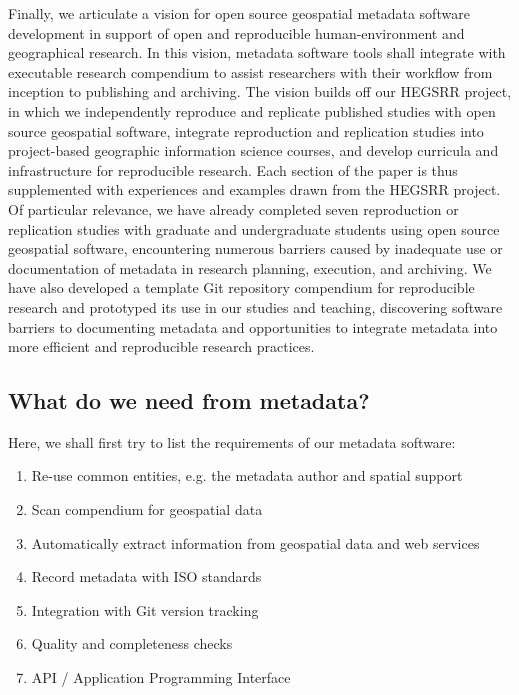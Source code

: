 \documentclass{isprs} %
\begin{document}
Finally, we articulate a vision for open source geospatial metadata software development in support of open and reproducible human-environment and geographical research.
In this vision, metadata software tools shall integrate with executable research compendium to assist researchers with their workflow from inception to publishing and archiving.
The vision builds off our HEGSRR project, in which we independently reproduce and replicate published studies with open source geospatial software, integrate reproduction and replication studies into project-based geographic information science courses, and develop curricula and infrastructure for reproducible research.
Each section of the paper is thus supplemented with experiences and examples drawn from the HEGSRR project.
Of particular relevance, we have already completed seven reproduction or replication studies with graduate and undergraduate students using open source geospatial software, encountering numerous barriers caused by inadequate use or documentation of metadata in research planning, execution, and archiving.
We have also developed a template Git repository compendium for reproducible research and prototyped its use in our studies and teaching, discovering software barriers to documenting metadata and opportunities to integrate metadata into more efficient and reproducible research practices.

\subsection{What do we need from metadata?}\label{metadataneeds}

Here, we shall first try to list the requirements of our metadata software:

\begin{enumerate}
\setlength\itemsep{0em}\setlength\parskip{0em}\setlength\topsep{0em}\setlength\partopsep{0em}\setlength\parsep{0em} 
\item{Re-use common entities, e.g. the metadata author and spatial support} 
\item{Scan compendium for geospatial data}
\item{Automatically extract information from geospatial data and web services}
\item{Record metadata with ISO standards}
\item{Integration with Git version tracking}
\item{Quality and completeness checks}
\item{API / Application Programming Interface}
\end{enumerate}
\end{document}
